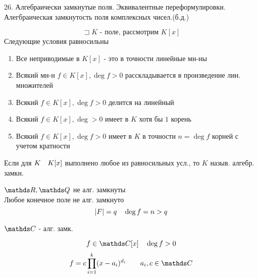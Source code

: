 \documentclass[12pt, fleqn]{article}
\begin{document}
\begin{question} {26. Алгебраически замкнутые поля. Эквивалентные переформулировки. \\Алегбраическая замкнутость поля
    комплексных чисел.(б.д.)}
    
    \begin{theorem} 
        \[\sqsupset K \text{ - поле, рассмотрим } K[x]\]
        Следующие условия равносильны
        \begin{enumerate}
            \item Все неприводимые в $K[x]$ - это в точности линейные мн-ны
            \item Всякий мн-н $f \in K[x], \deg f > 0$ расскладывается в произведение лин. множителей
            \item Всякий $f \in K[x], \deg f > 0$ делится на линейный
            \item Всякий $f \in K[x], \deg > 0$ имеет в $K$ хотя бы $1$ корень
            \item Всякий $f \in K[x], \deg f > 0$ имеет в $K$ в точности $n = \deg f$ корней с учетом кратности
        \end{enumerate}
    \end{theorem}
    
    \begin{definition} 
        Если для $K \quad K[x]$ выполнено любое из равносильных усл., то $K$ назыв. алгебр. замкн.
    \end{definition}

    \begin{examples} 
        $\R, \Q $ не алг. замкнуты\\
        Любое конечное поле не алг. замкнуто
        \[|F| = q \quad \deg f = n > q\]
    \end{examples}

    \begin{theorem} [б.д.]
        $\CC$ - алг. замк.
    \end{theorem}

    \begin{consequence} 
        \[f \in \CC[x] \q \deg f > 0\]
        \[f = c \prod_{i = 1}^k (x - a_i)^{d_i} \q\q a_i, c \in \CC\]
    \end{consequence}

\end{question}
\end{document}
